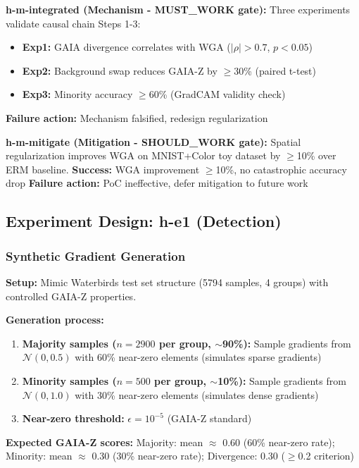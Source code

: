 \textbf{h-m-integrated (Mechanism - MUST\_WORK gate):}
Three experiments validate causal chain Steps 1-3:
\begin{itemize}
\item \textbf{Exp1:} GAIA divergence correlates with WGA ($|\rho|>0.7$, $p<0.05$)
\item \textbf{Exp2:} Background swap reduces GAIA-Z by $\geq$30\% (paired t-test)
\item \textbf{Exp3:} Minority accuracy $\geq$60\% (GradCAM validity check)
\end{itemize}
\textbf{Failure action:} Mechanism falsified, redesign regularization

\textbf{h-m-mitigate (Mitigation - SHOULD\_WORK gate):}
Spatial regularization improves WGA on MNIST+Color toy dataset by $\geq$10\% over ERM baseline.
\textbf{Success:} WGA improvement $\geq$10\%, no catastrophic accuracy drop
\textbf{Failure action:} PoC ineffective, defer mitigation to future work

\subsection{Experiment Design: h-e1 (Detection)}

\subsubsection{Synthetic Gradient Generation}

\textbf{Setup:} Mimic Waterbirds test set structure (5794 samples, 4 groups) with controlled GAIA-Z properties.

\textbf{Generation process:}
\begin{enumerate}
\item \textbf{Majority samples ($n=2900$ per group, $\sim$90\%):} Sample gradients from $\mathcal{N}(0, 0.5)$ with 60\% near-zero elements (simulates sparse gradients)
\item \textbf{Minority samples ($n=500$ per group, $\sim$10\%):} Sample gradients from $\mathcal{N}(0, 1.0)$ with 30\% near-zero elements (simulates dense gradients)
\item \textbf{Near-zero threshold:} $\epsilon = 10^{-5}$ (GAIA-Z standard)
\end{enumerate}

\textbf{Expected GAIA-Z scores:}
Majority: mean $\approx$ 0.60 (60\% near-zero rate); Minority: mean $\approx$ 0.30 (30\% near-zero rate); Divergence: 0.30 ($\geq$0.2 criterion)

